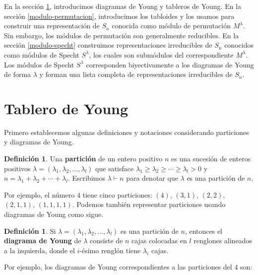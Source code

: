 \documentclass[12pt]{book}
\theoremstyle{definition}
\newtheorem{definition}[theorem]{Definición}
\newcounter{in}
\newcounter{ini}
\begin{document}
En la sección \ref{tablero}, introducimos diagramas de Young y tableros
de Young. En la sección \ref{modulo-permutacion}, introducimos los
tabloides y los usamos para construir una representación de $S_{n}$
conocida como módulo de permutación $M^{\lambda}$. Sin embargo, los
módulos de permutación son generalmente reducibles. En la sección
\ref{modulo-specht} construimos representaciones irreducibles de
$S_{n}$ conocidos como módulos de Specht $S^{\lambda}$, los cuales son
submódulos del correspondiente $M^{\lambda}$. Los módulos de
Specht $S^{\lambda}$ corresponden biyectivamente a los diagramas de
Young de forma $\lambda$ y forman una lista completa de
representaciones irreducibles de $S_{n}$.

\section{Tablero de Young}
\label{tablero}

Primero establecemos algunas definiciones y notaciones
considerando particiones y diagramas de Young.

\begin{definition}
  Una \textbf{partición} de un entero positivo $n$ es una sucesión de
  enteros positivos
  $\lambda=(\lambda_{1},\lambda_{2},\ldots,\lambda_{l})$ que satisface
  $\lambda_{1}\geq\lambda_{2}\geq\cdots\geq\lambda_{l}>0$ y
  $n=\lambda_{1}+\lambda_{2}+\cdots+\lambda_{l}$. Escribimos
  $\lambda\vdash n$ para denotar que $\lambda$ es una partición de $n$.
\end{definition}

Por ejemplo, el número $4$ tiene cinco particiones: $(4)$, $(3,1)$,
$(2,2)$, $(2,1,1)$, $(1,1,1,1)$. Podemos también representar
particiones usando diagramas de Young como sigue.

\begin{definition}
  Si $\lambda=(\lambda_{1},\lambda_{2},\ldots,\lambda_{l})$ es una
  partición de $n$, entonces el \textbf{diagrama de Young} de $\lambda$
  consiste de $n$ cajas colocadas en $l$ renglones alineados a la
  izquierda, donde el $i$-ésimo
  renglón tiene  $\lambda_{i}$ cajas.
\end{definition}

Por ejemplo, los diagramas de Young correspondientes a las particiones
del $4$ son: 
\end{document}
